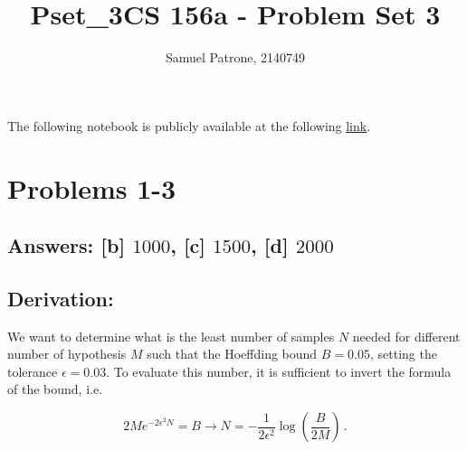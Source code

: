 \documentclass[11pt]{article}
\title{Pset\_3}
\begin{document}
    \title{CS 156a - Problem Set 3}
    \author{Samuel Patrone, 2140749}
    \maketitle
    

The following notebook is publicly available at the following
\href{https://github.com/spatrone/CS156A-Caltech.git}{link}.

\tableofcontents

    \hypertarget{problems-1-3}{%
\section{Problems 1-3}\label{problems-1-3}}

\hypertarget{answers-b-1000-c-1500-d-2000}{%
\subsection{\texorpdfstring{Answers: {[}b{]} \(1000\), {[}c{]}
\(1500\), {[}d{]}
\(2000\)}{Answers: {[}b{]} 1000, {[}c{]} 1500, {[}d{]} 2000}}\label{answers-b-1000-c-1500-d-2000}}

\hypertarget{derivation}{%
\subsection{Derivation:}\label{derivation}}

We want to determine what is the least number of samples \(N\) needed
for different number of hypothesis \(M\) such that the Hoeffding bound
\(B=0.05\), setting the tolerance \(\epsilon=0.03\). To evaluate this
number, it is sufficient to invert the formula of the bound, i.e.

\[
2 M e^{-2\epsilon^2 N} = B \rightarrow N=-\frac{1}{2\epsilon^2}\log\left(\frac{B}{2 M}\right)\,.
\]
\end{document}
